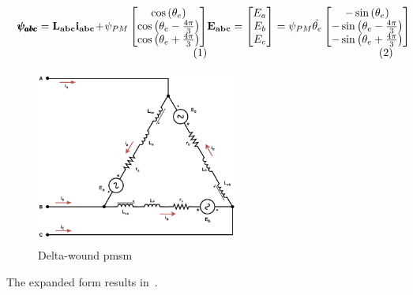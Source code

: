 \begin{subequations}
	\noindent\begin{minipage}{.5\linewidth}
		\begin{equation}
			\pmb{\psi_{abc}} = \mathbf{L_{abc}i_{abc}} + \psi_{PM} \begin{bmatrix}
				\cos{\left(\theta_e\right)} \\
				\cos{\left(\theta_e - \frac{4\pi}{3}\right)} \\
				\cos{\left(\theta_e + \frac{4\pi}{3}\right)} \\
			\end{bmatrix}
			\label{eq:flux_linkage}
		\end{equation}
	\end{minipage}%
	\begin{minipage}{.49\linewidth}
		\begin{equation}
			\mathbf{E_{abc}} = 
			\begin{bmatrix}
				E_a \\
				E_b \\
				E_c \\
			\end{bmatrix} = \psi_{PM} \dot{\theta_e}
			 \begin{bmatrix}
				-\sin{\left(\theta_e\right)} \\
				-\sin{\left(\theta_e - \frac{4\pi}{3}\right)} \\
				-\sin{\left(\theta_e + \frac{4\pi}{3}\right)} \\
			\end{bmatrix}
			\label{eq:back_emf}
		\end{equation}
	\end{minipage}%
\end{subequations}



\begin{figure}[!htb]
	\centering
	\includegraphics[width=0.6\textwidth]{Figures/Delta_model.pdf}
	\caption[Delta-wound \gls{pmsm}.]{Delta-wound \gls{pmsm}}
	\label{fig:delta_model}%
\end{figure}
The expanded form results in~.


